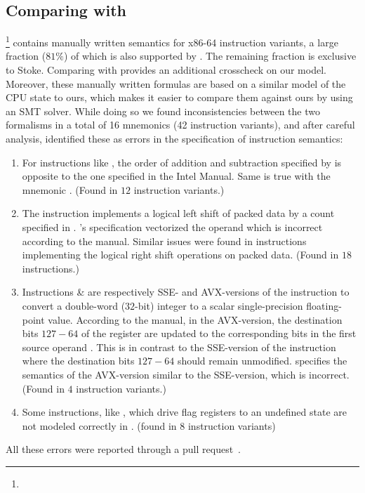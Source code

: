 \subsection{Comparing with \Stoke}\label{subsec:compare-stoke}
\footnote{} contains manually written semantics for \stokeIS{} x86-64 instruction variants, a large fraction ($81\%$) of which is also supported by \Strata. The remaining fraction is exclusive to Stoke. Comparing with \Stoke provides an additional crosscheck on our model.  Moreover, these manually written formulas are based on a similar model of the CPU state to ours, which makes it easier to compare them against ours by using an SMT solver. While doing so we found inconsistencies between the two formalisms in a total of 16 mnemonics (42 instruction variants), and after careful analysis, identified these as errors in the \Stoke specification of instruction semantics:
\begin{enumerate}
    \item For instructions like  , the order of addition and subtraction specified by \Stoke is opposite to the one specified in the Intel Manual. Same is true with the mnemonic . (Found in $12$ instruction variants.)
    
    \item  The instruction  implements a logical left shift of packed data by a count specified in . \Stoke's specification vectorized the operand  which is incorrect according to the manual. Similar issues were found in instructions implementing the logical right shift operations on packed data. (Found in  $18$ instructions.)
    
    \item Instructions  \&   are respectively SSE- and AVX-versions of the instruction to  convert a double-word ($32$-bit) integer to a scalar single-precision floating-point value. According to the manual, in the AVX-version,  the  destination bits $127-64$ of the  register  are updated to the corresponding bits in the first source operand . This  is in contrast to the SSE-version of the instruction where the destination bits $127-64$ should remain unmodified. \Stoke specifies the semantics of the AVX-version similar to the SSE-version, which is incorrect.  (Found in $4$ instruction variants.)
    
    \item Some instructions, like , which drive flag registers to an undefined state are not modeled correctly in \Stoke.    (found in $8$ instruction variants)  
\end{enumerate}
All these errors were reported through a pull request~\cite{Suppl}.

